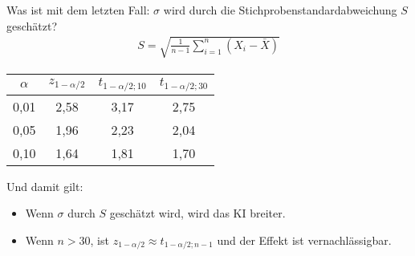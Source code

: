 \documentclass[t,11pt,aspectratio=169]{beamer}
\begin{document}
\begin{frame}
Was ist mit dem letzten Fall: $\sigma$ wird durch die Stichprobenstandardabweichung $S$ geschätzt?
\begin{align*}
	S = \sqrt{\frac{1}{n-1}\sum_{i=1}^{n}(X_i-\bar{X})}
\end{align*}
\pause
\begin{center}
\begin{tabular}{cccc}
$\alpha$ & $z_{1-\alpha/2}$ & $t_{1-\alpha/2; 10}$ & $t_{1-\alpha/2; 30}$\\
\hline
0,01 & 2,58 & 3,17 & 2,75\\
0,05 & 1,96 & 2,23 & 2,04 \\
0,10 & 1,64 & 1,81 & 1,70
\end{tabular}
\end{center}
\pause
Und damit gilt:
\begin{itemize}
	\item Wenn $\sigma$ durch $S$ geschätzt wird, wird das KI breiter.
	\item Wenn $n>30$, ist $z_{1-\alpha/2}\approx t_{1-\alpha/2; n-1}$ und der Effekt ist vernachlässigbar.
\end{itemize}
\end{frame}
\end{document}
